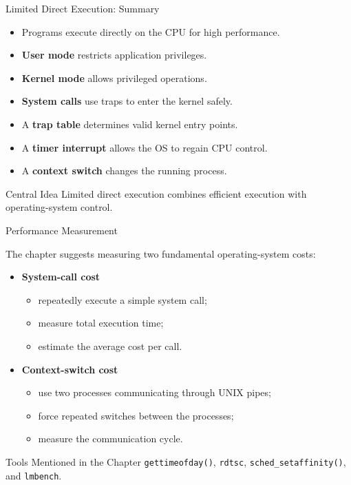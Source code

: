 \begin{frame}{Limited Direct Execution: Summary}

\begin{itemize}
    \item Programs execute directly on the CPU for high performance.
    \item \textbf{User mode} restricts application privileges.
    \item \textbf{Kernel mode} allows privileged operations.
    \item \textbf{System calls} use traps to enter the kernel safely.
    \item A \textbf{trap table} determines valid kernel entry points.
    \item A \textbf{timer interrupt} allows the OS to regain CPU control.
    \item A \textbf{context switch} changes the running process.
\end{itemize}

\begin{block}{Central Idea}
Limited direct execution combines efficient execution with
operating-system control.
\end{block}

\end{frame}

\begin{frame}{Performance Measurement}

The chapter suggests measuring two fundamental operating-system costs:

\begin{itemize}
    \item \textbf{System-call cost}
    \begin{itemize}
        \item repeatedly execute a simple system call;
        \item measure total execution time;
        \item estimate the average cost per call.
    \end{itemize}

    \item \textbf{Context-switch cost}
    \begin{itemize}
        \item use two processes communicating through UNIX pipes;
        \item force repeated switches between the processes;
        \item measure the communication cycle.
    \end{itemize}
\end{itemize}

\begin{block}{Tools Mentioned in the Chapter}
\texttt{gettimeofday()}, \texttt{rdtsc}, \texttt{sched\_setaffinity()},
and \texttt{lmbench}.
\end{block}

\end{frame}


